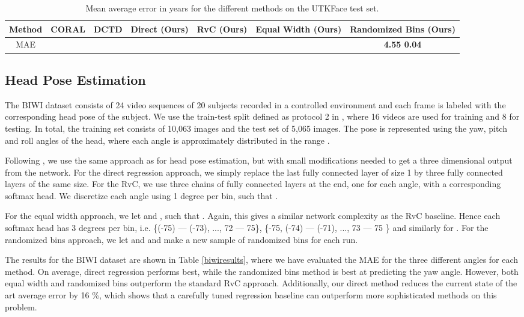 \documentclass[10pt, conference, a4paper]{IEEEtran}
\begin{document}
\begin{table*}[t]
\vspace{0.1in}
\renewcommand{\arraystretch}{1.3}
\caption{Mean average error in years for the different methods on the UTKFace \cite{zhifei2017cvpr} test set.}
\label{utkresults}
\centering
\begin{tabular}{c c c c c c c}
\hline
Method & CORAL \cite{cao2019rank}   & DCTD \cite{gustafsson2019dctd} & Direct (Ours) & RvC (Ours) & Equal Width (Ours) & Randomized Bins (Ours)\\
\hline
MAE &  &       &  &             &  & \textbf{4.55  0.04}             \\
\hline
\end{tabular}
\end{table*}


\subsection{Head Pose Estimation}
The BIWI dataset \cite{eth_biwi_00839} consists of 24 video sequences of 20 subjects recorded in a controlled environment and each frame is labeled with the corresponding head pose of the subject. We use the train-test split defined as protocol 2 in \cite{yang2019fsa}, where 16 videos are used for training and 8 for testing. In total, the training set consists of 10,063 images and the test set of 5,065 images. The pose is represented using the yaw, pitch and roll angles of the head, where each angle is approximately distributed in the range .

Following \cite{gustafsson2019dctd}, we use the same approach as for head pose estimation, but with small modifications needed to get a three dimensional output from the network. For the direct regression approach, we simply replace the last fully connected layer of size 1 by three fully connected layers of the same size. For the RvC, we use three chains of fully connected layers at the end, one for each angle, with a corresponding softmax head. We discretize each angle using 1 degree per bin, such that .

For the equal width approach, we let  and , such that . Again, this gives a similar network complexity as the RvC baseline. Hence each softmax head has 3 degrees per bin, i.e. \{(-75) --- (-73), ..., 72 --- 75\}, \{-75, (-74) --- (-71), ..., 73 --- 75 \} and similarly for . For the randomized bins approach, we let  and  and make a new sample of randomized bins for each run. 

The results for the BIWI dataset are shown in Table \ref{biwiresults}, where we have evaluated the MAE for the three different angles for each method. On average, direct regression performs best, while the randomized bins method is best at predicting the yaw angle. However, both equal width and randomized bins outperform the standard RvC approach. Additionally, our direct method reduces the current state of the art average error by 16 \%, which shows that a carefully tuned regression baseline can outperform more sophisticated methods on this problem. 
\end{document}
